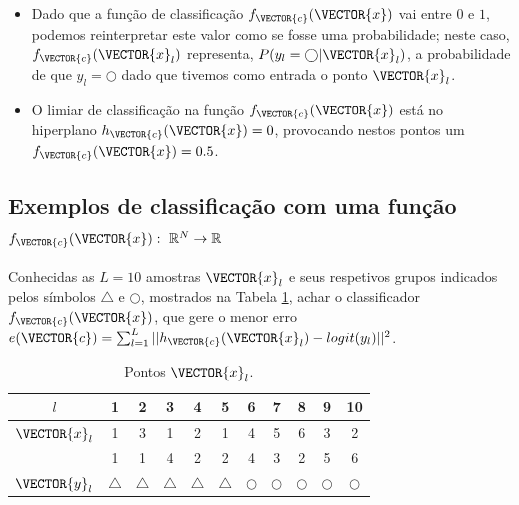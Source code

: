 \begin{tcbattention}
\begin{itemize}
\item Dado que a função de classificação $f_{\VECTOR{c}}(\VECTOR{x})$ vai entre $0$ e $1$,
podemos reinterpretar este valor como se fosse uma probabilidade;
neste caso, $f_{\VECTOR{c}}(\VECTOR{x}_l)$ representa, $P(y_l=\bigcirc|\VECTOR{x}_l)$, 
a probabilidade de que $y_l=\bigcirc$ dado que tivemos como entrada o ponto $\VECTOR{x}_l$.
\item O limiar de classificação na função $f_{\VECTOR{c}}(\VECTOR{x})$ está no hiperplano $h_{\VECTOR{c}}(\VECTOR{x})=0$,
provocando nestos pontos um $f_{\VECTOR{c}}(\VECTOR{x})=0.5$.
\end{itemize}
\end{tcbattention}



\subsection{Exemplos de classificação com uma função
$f_{\VECTOR{c}}(\VECTOR{x}):~\mathbb{R}^N \rightarrow \mathbb{R}$ }

\begin{example}\label{ex:theo:reglogrnr1}
Conhecidas as $L=10$ amostras $\VECTOR{x}_l$ e seus respetivos grupos indicados pelos símbolos $\bigtriangleup$ e $\bigcirc$, 
mostrados na Tabela \ref{table:theo:reglogrnr1:xn},
achar o classificador $f_{\VECTOR{c}}(\VECTOR{x})$, 
que gere o menor erro $e(\VECTOR{c}) =  \sum_{l=1}^{L} ||h_{\VECTOR{c}}(\VECTOR{x}_l)-logit(y_l)||^2$.
\end{example}


\begin{table}[h!]
\centering
\begin{tabular}{|c||c|c|c|c|c||c|c|c|c|c||} 
 \hline
$l$            & 1 & 2 & 3 & 4 & 5 & 6 & 7 & 8 & 9 & 10 \\ \hline \hline
$\VECTOR{x}_l$ & 1 & 3 & 1 & 2 & 1 & 4 & 5 & 6 & 3 & 2 \\ 
~              & 1 & 1 & 4 & 2 & 2 & 4 & 3 & 2 & 5 & 6 \\ \hline
$\VECTOR{y}_l$ & $\bigtriangleup$ & $\bigtriangleup$ & $\bigtriangleup$ & $\bigtriangleup$ & $\bigtriangleup$ 
      & $\bigcirc$ & $\bigcirc$ & $\bigcirc$ & $\bigcirc$ & $\bigcirc$\\ \hline
\end{tabular}
\caption{Pontos $\VECTOR{x}_l$.}
\label{table:theo:reglogrnr1:xn}
\end{table}


